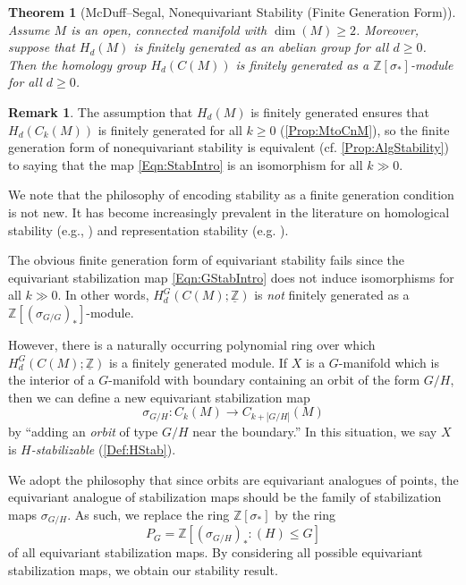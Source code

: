 \documentclass[11pt]{amsart}
\newtheorem{thm}[equation]{Theorem}
\theoremstyle{definition}
\newtheorem{remark}[equation]{Remark}
\numberwithin{equation}{subsection} %
\def\z{\mathbb{Z}}
\def\mfz{\underline{\mathbb{Z}}}
\begin{document}
\begin{thm}[McDuff--Segal, Nonequivariant Stability (Finite Generation Form)]
Assume $M$ is an open, connected manifold with $\dim(M)\geq2$. Moreover, suppose that $H_d(M)$ is finitely generated as an abelian group for all $d\geq 0$. Then the homology group $H_d(C(M))$ is finitely generated as a $\z[\sigma_*]$-module for all $d\geq 0$. 
\end{thm}

\begin{remark}
The assumption that $H_d(M)$ is finitely generated ensures that $H_d(C_k(M))$ is finitely generated for all $k \geq 0$ (\cref{Prop:MtoCnM}), so the finite generation form of nonequivariant stability is equivalent (cf. \cref{Prop:AlgStability}) to saying that the map \eqref{Eqn:StabIntro} is an isomorphism for all $k \gg 0$. 

We note that the philosophy of encoding stability as a finite generation condition is not new. It has become increasingly prevalent in the literature on homological stability (e.g., \cite[Theorem 1.1]{ADCK20}) and representation stability (e.g. \cite[Theorem 6.2.1]{CEF-FI}).
\end{remark}

The obvious finite generation form of equivariant stability fails since the equivariant stabilization map \eqref{Eqn:GStabIntro} does not induce isomorphisms for all $k \gg 0$. In other words, $H_d^G(C(M); \mfz)$ is \emph{not} finitely generated as a $\z[(\sigma_{G/G})_*]$-module. 

However, there is a naturally occurring polynomial ring over which $H_d^G(C(M); \mfz)$ is a finitely generated module. If $X$ is a $G$-manifold which is the interior of a $G$-manifold with boundary containing an orbit of the form $G/H$, then we can define a new equivariant stabilization map
\begin{equation}\label{Eqn:GHStabIntro}
\sigma_{G/H}: C_k(M) \to C_{k+|G/H|}(M)
\end{equation}
by ``adding an \emph{orbit} of type $G/H$ near the boundary.'' In this situation, we say $X$ is \emph{$H$-stabilizable} (\cref{Def:HStab}). 

We adopt the philosophy that since orbits are equivariant analogues of points, the equivariant analogue of stabilization maps should be the family of stabilization maps $\sigma_{G/H}$. As such, we replace the ring $\z[\sigma_*]$ by the ring 
$$P_G=\z[(\sigma_{G/H})_*: (H) \leq G]$$
of all equivariant stabilization maps. By considering all possible equivariant stabilization maps, we obtain our stability result.
\end{document}
